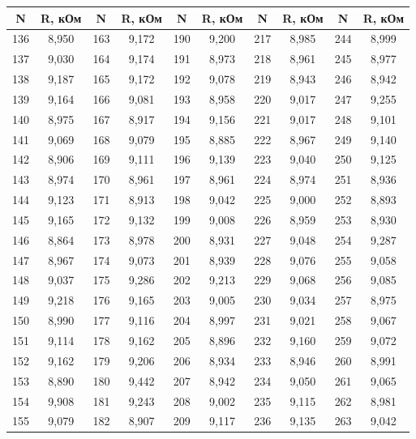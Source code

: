\documentclass[a4paper, 12pt]{article}
\begin{document}
		\begin{longtable}[H]{|c|c|c|c|c|c|c|c|c|c|}
			\hline
			N & R, кОм & N & R, кОм & N & R, кОм & N & R, кОм & N & R, кОм \\ \hline
			136 & 8,950 & 163 & 9,172 & 190 & 9,200 & 217 & 8,985 & 244 & 8,999 \\ \hline
			137 & 9,030 & 164 & 9,174 & 191 & 8,973 & 218 & 8,961 & 245 & 8,977 \\ \hline
			138 & 9,187 & 165 & 9,172 & 192 & 9,078 & 219 & 8,943 & 246 & 8,942 \\ \hline
			139 & 9,164 & 166 & 9,081 & 193 & 8,958 & 220 & 9,017 & 247 & 9,255 \\ \hline
			140 & 8,975 & 167 & 8,917 & 194 & 9,156 & 221 & 9,017 & 248 & 9,101 \\ \hline
			141 & 9,069 & 168 & 9,079 & 195 & 8,885 & 222 & 8,967 & 249 & 9,140 \\ \hline
			142 & 8,906 & 169 & 9,111 & 196 & 9,139 & 223 & 9,040 & 250 & 9,125 \\ \hline
			143 & 8,974 & 170 & 8,961 & 197 & 8,961 & 224 & 8,974 & 251 & 8,936 \\ \hline
			144 & 9,123 & 171 & 8,913 & 198 & 9,042 & 225 & 9,000 & 252 & 8,893 \\ \hline
			145 & 9,165 & 172 & 9,132 & 199 & 9,008 & 226 & 8,959 & 253 & 8,930 \\ \hline
			146 & 8,864 & 173 & 8,978 & 200 & 8,931 & 227 & 9,048 & 254 & 9,287 \\ \hline
			147 & 8,967 & 174 & 9,073 & 201 & 8,939 & 228 & 9,076 & 255 & 9,058 \\ \hline
			148 & 9,037 & 175 & 9,286 & 202 & 9,213 & 229 & 9,068 & 256 & 9,085 \\ \hline
			149 & 9,218 & 176 & 9,165 & 203 & 9,005 & 230 & 9,034 & 257 & 8,975 \\ \hline
			150 & 8,990 & 177 & 9,116 & 204 & 8,997 & 231 & 9,021 & 258 & 9,067 \\ \hline
			151 & 9,114 & 178 & 9,162 & 205 & 8,896 & 232 & 9,160 & 259 & 9,072 \\ \hline
			152 & 9,162 & 179 & 9,206 & 206 & 8,934 & 233 & 8,946 & 260 & 8,991 \\ \hline
			153 & 8,890 & 180 & 9,442 & 207 & 8,942 & 234 & 9,050 & 261 & 9,065 \\ \hline
			154 & 9,908 & 181 & 9,243 & 208 & 9,002 & 235 & 9,115 & 262 & 8,981 \\ \hline
			155 & 9,079 & 182 & 8,907 & 209 & 9,117 & 236 & 9,135 & 263 & 9,042 \\ \hline

\end{longtable}
\end{document}
